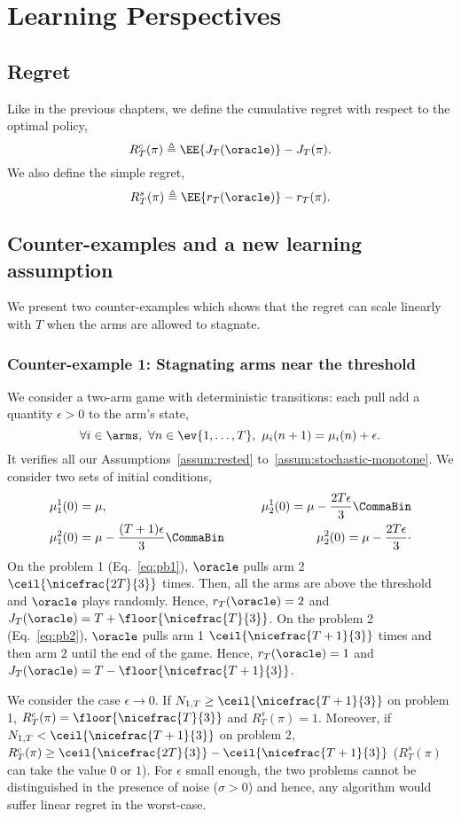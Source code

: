 \section{Learning Perspectives}
\subsection{Regret}
Like in the previous chapters, we define the cumulative regret with respect to the optimal policy, 
\[
R^c_T(\pi) \triangleq \EE{J_T(\oracle)} - J_T(\pi).
\]
We also define the simple regret, 
\[
R^s_T(\pi) \triangleq \EE{r_T(\oracle)} - r_T(\pi).
\]
\subsection{Counter-examples and a new learning assumption}
We present two counter-examples which shows that the regret can scale linearly with $T$ when the arms are allowed to stagnate.
\subsubsection{Counter-example 1: Stagnating arms near the threshold}
We consider a two-arm game with deterministic transitions: each pull add a quantity $\epsilon>0$ to the arm's state, 
\[
\forall i \in \arms,\  \forall n \in \ev{1, \dots, T},\ \mu_i(n+1) = \mu_i(n) + \epsilon.
\]
It verifies all our Assumptions~\ref{assum:rested} to~\ref{assum:stochastic-monotone}. We consider two sets of initial conditions, 
\begin{align}
&\mu_1^1(0) = \mu, \qquad &\mu_2^1(0) = \mu - \frac{2T\epsilon}{3} \CommaBin\label{eq:pb1}\\
&\mu_1^2(0) = \mu - \frac{(T+1)\epsilon}{3}\CommaBin \qquad &\mu_2^2(0) = \mu - \frac{2T\epsilon}{3}\cdot\label{eq:pb2}
\end{align}
On the problem 1 (Eq.~\ref{eq:pb1}), $\oracle$ pulls arm 2 $\ceil{\nicefrac{2T}{3}}$ times. Then, all the arms are above the threshold and $\oracle$ plays randomly. Hence, $r_T(\oracle)=2$ and $J_T(\oracle) = T +  \floor{\nicefrac{T}{3}}$. On the problem 2 (Eq.~\ref{eq:pb2}), $\oracle$ pulls arm 1 $\ceil{\nicefrac{T+1}{3}}$ times and then arm $2$ until the end of the game. Hence, $r_T(\oracle)=1$ and $J_T(\oracle) = T -  \floor{\nicefrac{T+1}{3}}$.

We consider the case $\epsilon \rightarrow 0$.  If $N_{1,T} \geq \ceil{\nicefrac{T+1}{3}}$ on problem 1, $R^c_T(\pi)= \floor{\nicefrac{T}{3}}$ and $R^s_T(\pi)= 1$. Moreover, if $N_{1,T} < \ceil{\nicefrac{T+1}{3}}$ on problem 2, $R^c_T(\pi)\geq \ceil{\nicefrac{2T}{3}} - \ceil{\nicefrac{T+1}{3}}$ ($R^s_T(\pi)$ can take the value $0$ or $1$). For $\epsilon$ small enough, the two problems cannot be distinguished in the presence of noise ($\sigma >0$) and hence, any algorithm would suffer linear regret in the worst-case.

